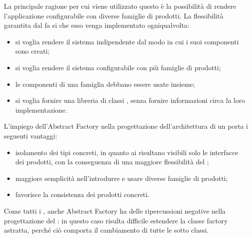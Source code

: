 	La principale ragione per cui viene utilizzato questo  è la possibilità di rendere l'applicazione configurabile con diverse famiglie di prodotti. La flessibilità garantita dal  fa si che esso venga implementato ogniqualvolta:
	\begin{itemize}
		\item si voglia rendere il sistema indipendente dal modo in cui i suoi componenti sono creati;
		\item si voglia rendere il sistema configurabile con più famiglie di prodotti;
		\item le componenti di una famiglia debbano essere usate insieme;
		\item si voglia fornire una libreria di classi , senza fornire informazioni circa la loro implementazione.
	\end{itemize}
		L'impiego dell'Abstract Factory nella progettazione dell'architettura di un   porta i seguenti vantaggi:
		\begin{itemize}
			\item isolamento dei tipi concreti, in quanto ai  risultano visibili solo le interfacce dei prodotti, con la conseguenza di una maggiore flessibilità del ;
			\item maggiore semplicità nell'introdurre e usare diverse famiglie di prodotti;
			\item favorisce la consistenza dei prodotti concreti.
		\end{itemize}
		Come tutti i , anche Abstract Factory ha delle ripercussioni negative nella progettazione del : in questo caso risulta difficile estendere la classe factory astratta, perché ciò comporta il cambiamento di tutte le sotto classi.

